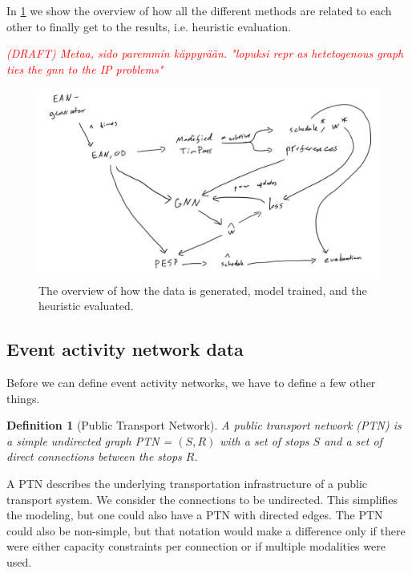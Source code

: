\documentclass[english, 12pt, a4paper, sci, utf8, a-2b, online]{aaltothesis}
\newtheorem{definition}{Definition}
\newcommand{\draft}[1]{\textcolor{red}{\em (DRAFT) #1}}
\begin{document}
In \cref{fig:process-flow} we show the overview of how all the different methods are related to each other to finally get to the results, i.e. heuristic evaluation.

\draft{
    Metaa, sido paremmin käppyrään. "lopuksi repr as hetetogenous graph ties the gnn to the IP problems"
}
\begin{figure}
    \centering
    \includegraphics[width=\textwidth]{figures/process-flow.png}
    \caption{The overview of how the data is generated, model trained, and the heuristic evaluated.}
    \label{fig:process-flow}
\end{figure}
\subsection{Event activity network data}
\label{sec:ean-def}







Before we can define event activity networks, we have to define a few other things.
\begin{definition}[Public Transport Network]\label{def:ptn}
    A \textit{public transport network} (PTN) is a simple undirected graph PTN = $(S, R)$ with a set of stops $S$ and a set of direct connections between the stops $R$. 
\end{definition}

A PTN describes the underlying transportation infrastructure of a public transport system. We consider the connections to be undirected. This simplifies the modeling, but one could also have a PTN with directed edges. The PTN could also be non-simple, but that notation would make a difference only if there were either capacity constraints per connection or if multiple modalities were used.
\end{document}
